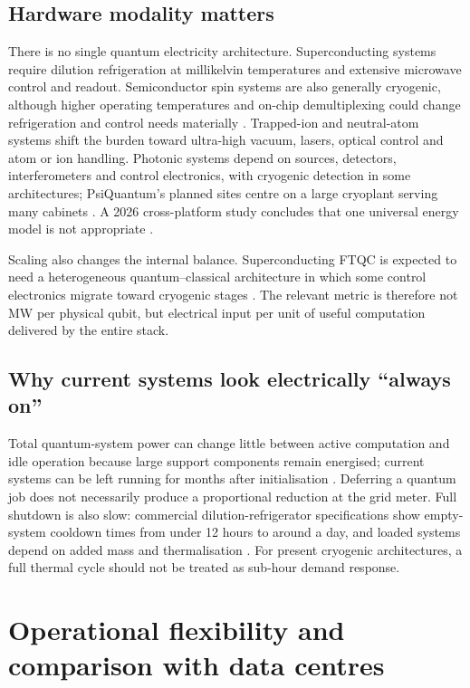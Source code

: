 \documentclass[11pt,a4paper]{article}
\begin{document}
\subsection{Hardware modality matters}
There is no single quantum electricity architecture. Superconducting systems require dilution refrigeration at millikelvin temperatures and extensive microwave control and readout. Semiconductor spin systems are also generally cryogenic, although higher operating temperatures and on-chip demultiplexing could change refrigeration and control needs materially \citep{santos2026spin}. Trapped-ion and neutral-atom systems shift the burden toward ultra-high vacuum, lasers, optical control and atom or ion handling. Photonic systems depend on sources, detectors, interferometers and control electronics, with cryogenic detection in some architectures; PsiQuantum's planned sites centre on a large cryoplant serving many cabinets \citep{bea2025psiq}. A 2026 cross-platform study concludes that one universal energy model is not appropriate \citep{carrasco2026energy}.

Scaling also changes the internal balance. Superconducting FTQC is expected to need a heterogeneous quantum--classical architecture in which some control electronics migrate toward cryogenic stages \citep{kawabata2026cryo}. The relevant metric is therefore not MW per physical qubit, but electrical input per unit of useful computation delivered by the entire stack.

\subsection{Why current systems look electrically ``always on''}
Total quantum-system power can change little between active computation and idle operation because large support components remain energised; current systems can be left running for months after initialisation \citep{carrasco2026energy}. Deferring a quantum job does not necessarily produce a proportional reduction at the grid meter. Full shutdown is also slow: commercial dilution-refrigerator specifications show empty-system cooldown times from under 12 hours to around a day, and loaded systems depend on added mass and thermalisation \citep{bluefors2026dr,bluefors2026sd}. For present cryogenic architectures, a full thermal cycle should not be treated as sub-hour demand response.

\section{Operational flexibility and comparison with data centres}
\end{document}
